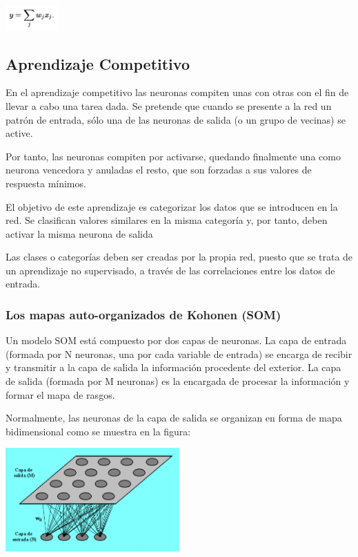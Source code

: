 \begin{center}
\includegraphics[width=0.15\textwidth]{img/formula2}
\end{center}


\subsection{Aprendizaje Competitivo}


En el aprendizaje competitivo las neuronas compiten unas con otras con el fin de llevar a cabo una tarea dada. Se pretende que cuando se presente a la red un patrón de entrada, sólo una de las neuronas de salida (o un grupo de vecinas) se active.

Por tanto, las neuronas compiten por activarse, quedando finalmente una como neurona vencedora y anuladas el resto, que son forzadas a sus valores de respuesta mínimos.

El objetivo de este aprendizaje es categorizar los datos que se introducen en la red. Se clasifican valores similares en la misma categoría y, por tanto, deben activar la misma neurona de salida

Las clases o categorías deben ser creadas por la propia red, puesto que se trata de un aprendizaje no supervisado, a través de las correlaciones entre los datos de entrada.

\newpage
\subsubsection{Los mapas auto-organizados de Kohonen (SOM)}

Un modelo SOM está compuesto por dos capas de neuronas. La capa de entrada (formada por N neuronas, una por cada variable de entrada) se encarga de recibir y transmitir a la capa de salida la información procedente del exterior. La capa de salida (formada por M neuronas) es la encargada de procesar la información y formar el mapa de rasgos.

Normalmente, las neuronas de la capa de salida se organizan en forma de mapa bidimensional como se muestra en la figura:

\begin{center}
\includegraphics[width=0.5\textwidth]{img/neuronas1}
\end{center}


